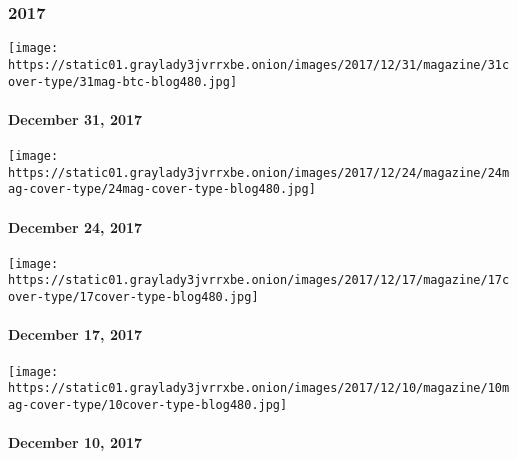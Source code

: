 \hypertarget{2017}{%
\subsubsection{2017}\label{2017}}

\href{https://www.nytimes3xbfgragh.onion/interactive/2017/12/28/magazine/the-lives-they-lived-2017.html}{}

\texttt{[image: https://static01.graylady3jvrrxbe.onion/images/2017/12/31/magazine/31cover-type/31mag-btc-blog480.jpg]}

\hypertarget{december-31-2017}{%
\paragraph{December 31, 2017}\label{december-31-2017}}

\href{https://www.nytimes3xbfgragh.onion/issue/magazine/2017/12/26/122417-issue}{}

\texttt{[image: https://static01.graylady3jvrrxbe.onion/images/2017/12/24/magazine/24mag-cover-type/24mag-cover-type-blog480.jpg]}

\hypertarget{december-24-2017}{%
\paragraph{December 24, 2017}\label{december-24-2017}}

\href{https://www.nytimes3xbfgragh.onion/interactive/2017/12/13/magazine/the-reckoning-women-and-power-in-the-workplace.html}{}

\texttt{[image: https://static01.graylady3jvrrxbe.onion/images/2017/12/17/magazine/17cover-type/17cover-type-blog480.jpg]}

\hypertarget{december-17-2017}{%
\paragraph{December 17, 2017}\label{december-17-2017}}

\href{https://www.nytimes3xbfgragh.onion/interactive/2017/12/07/magazine/great-performers-horror-show.html}{}

\texttt{[image: https://static01.graylady3jvrrxbe.onion/images/2017/12/10/magazine/10mag-cover-type/10cover-type-blog480.jpg]}

\hypertarget{december-10-2017}{%
\paragraph{December 10, 2017}\label{december-10-2017}}

